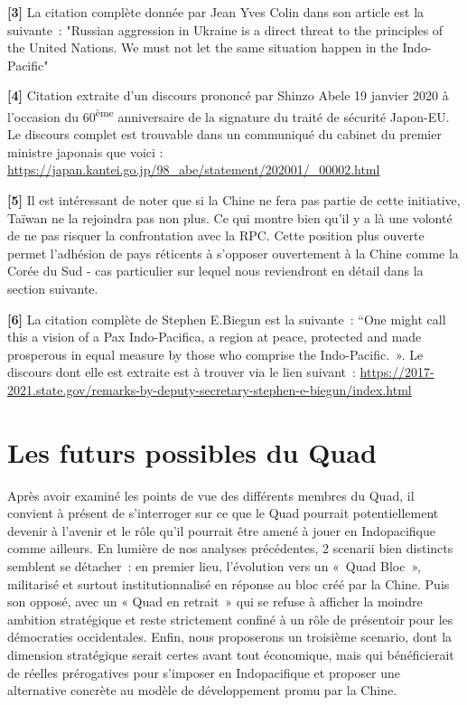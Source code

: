 \documentclass[11pt,a4paper]{article}
\begin{document}
\textbf{{[}3{]}} La citation complète donnée par Jean Yves Colin dans son article est la suivante~: "Russian aggression in Ukraine is a direct threat to the principles of the United Nations. We must not let the same situation happen in the Indo-Pacific"

\textbf{{[}4{]}} Citation extraite d'un discours prononcé par Shinzo Abele 19 janvier 2020 à l'occasion du 60\textsuperscript{ème} anniversaire de la signature du traité de sécurité Japon-EU. Le discours complet est trouvable dans un communiqué du cabinet du premier ministre japonais que voici : \url{https://japan.kantei.go.jp/98_abe/statement/202001/_00002.html}

\textbf{{[}5{]}} Il est intéressant de noter que si la Chine ne fera pas partie de cette initiative, Taïwan ne la rejoindra pas non plus. Ce qui montre bien qu'il y a là une volonté de ne pas risquer la confrontation avec la RPC. Cette position plus ouverte permet l'adhésion de pays réticents à s'opposer ouvertement à la Chine comme la Corée du Sud - cas particulier sur lequel nous reviendront en détail dans la section suivante.

\textbf{{[}6{]}} La citation complète de Stephen E.Biegun est la suivante~: ``One might call this a vision of a Pax Indo-Pacifica, a region at peace, protected and made prosperous in equal measure by those who comprise the Indo-Pacific.~». Le discours dont elle est extraite est à trouver via le lien suivant~: \url{https://2017-2021.state.gov/remarks-by-deputy-secretary-stephen-e-biegun/index.html}

\section{Les futurs possibles du Quad}

Après avoir examiné les points de vue des différents membres du Quad, il convient à présent de s'interroger sur ce que le Quad pourrait potentiellement devenir à l'avenir et le rôle qu'il pourrait être amené à jouer en Indopacifique comme ailleurs. En lumière de nos analyses précédentes, 2 scenarii bien distincts semblent se détacher~: en premier lieu, l'évolution vers un «~Quad Bloc~», militarisé et surtout institutionnalisé en réponse au bloc créé par la Chine. Puis son opposé, avec un « Quad en retrait~» qui se refuse à afficher la moindre ambition stratégique et reste strictement confiné à un rôle de présentoir pour les démocraties occidentales. Enfin, nous proposerons un troisième scenario, dont la dimension stratégique serait certes avant tout économique, mais qui bénéficierait de réelles prérogatives pour s'imposer en Indopacifique et proposer une alternative concrète au modèle de développement promu par la Chine.
\end{document}
